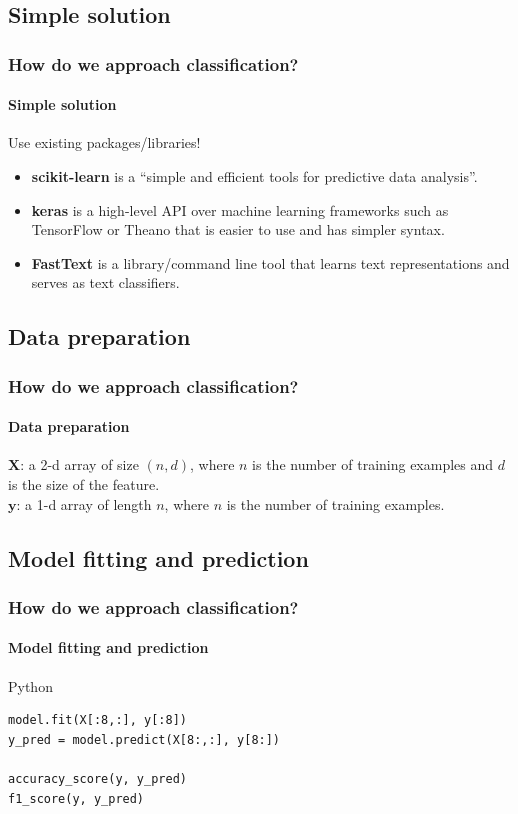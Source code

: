 \documentclass{beamer}
\begin{document}
\subsection{Simple solution}
\begin{frame}
    \frametitle{How do we approach classification?}
    \framesubtitle{Simple solution}
    Use existing packages/libraries!
    \begin{itemize}
        \item \textbf{scikit-learn} is a ``simple and efficient tools for predictive data analysis''.
        \item \textbf{keras} is a high-level API over machine learning frameworks such as TensorFlow or Theano that is easier to use and has simpler syntax.
        \item \textbf{FastText} is a library/command line tool that learns text representations and serves as text classifiers. 
    \end{itemize}
\end{frame}

\subsection{Data preparation}
\begin{frame}
    \frametitle{How do we approach classification?}
    \framesubtitle{Data preparation}
    $\mathbf{X}$: a 2-d array of size $(n, d)$, where $n$ is the number of training examples and $d$ is the size of the feature.\\
    $\mathbf{y}$: a 1-d array of length $n$, where $n$ is the number of training examples.
\end{frame}

\subsection{Model fitting and prediction}
\begin{frame}[containsverbatim]
    \frametitle{How do we approach classification?}
    \framesubtitle{Model fitting and prediction}
    \begin{block}{Python}
        \tiny
        \begin{lstlisting}
model.fit(X[:8,:], y[:8])
y_pred = model.predict(X[8:,:], y[8:])

accuracy_score(y, y_pred)
f1_score(y, y_pred)
        \end{lstlisting}
    \end{block}
\end{frame}
\end{document}
